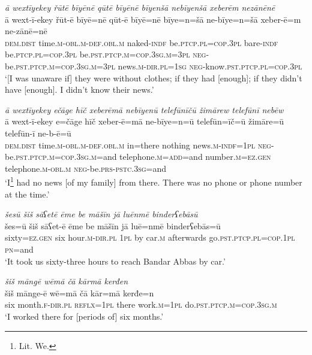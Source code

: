 \ea \label{ŽM.30}
\textit{ā wextīyekey řūtē bīyēnē qūtē bīyēnē bīyenšā nebīyenšā xeberēm nezānēnē} \\ 
\gll ā wext-ī-ekey řūt-ē bīyē=nē qūt-ē bīyē=nē bīye=n=šā ne-bīye=n=šā xeber-ē=m ne-zānē=nē \\ 
 \textsc{dem.dist} time\textsc{.m}\textsc{-obl}\textsc{.m}\textsc{-def}\textsc{.obl}\textsc{.m} naked\textsc{-indf} be\textsc{.ptcp}\textsc{.pl}\textsc{=cop}\textsc{.3pl} bare\textsc{-indf} be\textsc{.ptcp}\textsc{.pl}\textsc{=cop}\textsc{.3pl} be\textsc{.pst}\textsc{.ptcp}\textsc{.m}\textsc{=cop}\textsc{.3sg}\textsc{.m}\textsc{=3pl} \textsc{neg-}be\textsc{.pst}\textsc{.ptcp}\textsc{.m}\textsc{=cop}\textsc{.3sg}\textsc{.m}\textsc{=3pl} news\textsc{.m}\textsc{-dir}\textsc{.pl}\textsc{=\textsc{1sg}} \textsc{neg-}know\textsc{.pst}\textsc{.ptcp}\textsc{.pl}\textsc{=cop}\textsc{.3pl} \\ 
\glt `[I was unaware if] they were without clothes; if they had [enough]; if they didn’t have [enough]. I didn't know their news.'
\z 
 
\ea \label{ŽM.32}
\textit{ā wextīyekey ečāge hīč xeberēmā nebīyenū telefūnīčū žimārew telefūnī nebēw} \\ 
\gll ā wext-ī-ekey e=čāge hīč xeber-ē=mā ne-bīye=n=ū telefūn=īč=ū žimāre=ū telefūn-ī ne-b-ē=ū \\ 
 \textsc{dem.dist} time\textsc{.m}\textsc{-obl}\textsc{.m}\textsc{-def}\textsc{.obl}\textsc{.m} in=there nothing news\textsc{.m}\textsc{-indf}\textsc{=\textsc{1pl}} \textsc{neg-}be\textsc{.pst}\textsc{.ptcp}\textsc{.m}\textsc{=cop}\textsc{.3sg}\textsc{.m}=and telephone\textsc{.m}\textsc{=add}=and number\textsc{.m}\textsc{=ez.gen} telephone\textsc{.m}\textsc{-obl}\textsc{.m} \textsc{neg-}be\textsc{.prs}\textsc{-pstc}\textsc{.3sg}=and \\ 
\glt `I\footnote{Lit. We.}  had no news [of my family] from there. There was no phone or phone number at the time.'
\z 
 
\ea \label{ŽM.33}
\textit{šesū šiš sāʕetē ēme be māšīn jā luēnmē binderʕebāsū} \\ 
\gll šes=ū šiš sāʕet-ē ēme be māšīn jā luē=nmē binderʕebās=ū \\ 
 sixty\textsc{=ez.gen} six hour\textsc{.m}\textsc{-dir}\textsc{.pl} \textsc{1pl} by car\textsc{.m} afterwards go\textsc{.pst}\textsc{.ptcp}\textsc{.pl}\textsc{=cop}\textsc{.\textsc{1pl}} \textsc{pn}=and \\ 
\glt `It took us sixty-three hours to reach Bandar Abbas by car.'
\z 
 
\ea \label{ŽM.35}
\textit{šiš māngē wēmā čā kārmā kerđen} \\ 
\gll šiš mānge-ē wē=mā čā kār=mā kerđe=n \\ 
 six month\textsc{.f}\textsc{-dir}\textsc{.pl} \textsc{reflx}\textsc{=\textsc{1pl}} there work\textsc{.m}\textsc{=\textsc{1pl}} do\textsc{.pst}\textsc{.ptcp}\textsc{.m}\textsc{=cop}\textsc{.3sg}\textsc{.m} \\ 
\glt `I worked there for [periods of] six months.'
\z 
 
